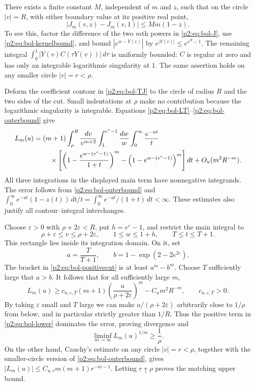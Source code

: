 \documentclass[11pt,a4paper]{article}
\theoremstyle{definition}
\theoremstyle{remark}
\numberwithin{equation}{section}
\begin{document}
There exists a finite constant $M$, independent of $m$ and $z$, such that
on the circle $|v|=R$, with either boundary value at its positive real
point,
\begin{equation}\label{p2:eq:bol-outerbound}
 |J_m(v,z)-J_m(v,1)|\le M m(1-z).
\end{equation}
To see this, factor the difference of the two $m$th powers in
\eqref{p2:eq:bol-J}, use \eqref{p2:eq:bol-kernelbound}, and bound
$|e^{w-Y(v)}|$ by $e^{|Y(v)|}\le e^{e^R-1}$.  The remaining integral
$\int_0^1|Y(v)C(\tau Y(v))|\,d\tau$ is uniformly bounded: $C$ is regular
at zero and has only an integrable logarithmic singularity at $1$.
The same assertion holds on any smaller circle $|v|=r<\rho$.

Deform the coefficient contour in \eqref{p2:eq:bol-TJ} to the circle of
radius $R$ and the two sides of the cut.  Small indentations at $\rho$
make no contribution because the logarithmic singularity is integrable.
Equations \eqref{p2:eq:bol-LT}--\eqref{p2:eq:bol-outerbound} give
\begin{align}\label{p2:eq:bol-positivecut}
 L_m(u)={}&(m+1)\int_\rho^R\frac{dv}{v^{m+2}}
 \int_1^{e^v-1}\frac{dw}{w}\int_0^\infty\frac{e^{-ut}}t\\
 &\quad\times\left[
  \left(1-\frac{e^{w-(e^v-1)}}{1+t}\right)^m
  -\left(1-e^{w-(e^v-1)}\right)^m\right]dt
 +O_u(m^2R^{-m}).\notag
\end{align}
All three integrations in the displayed main term have nonnegative
integrands.  The error follows from \eqref{p2:eq:bol-outerbound} and
$\int_0^\infty e^{-ut}(1-z(t))\,dt/t
 =\int_0^\infty e^{-ut}/(1+t)\,dt<\infty$.
These estimates also justify all contour--integral interchanges.

Choose $\varepsilon>0$ with $\rho+2\varepsilon<R$, put
$h=e^\varepsilon-1$, and restrict the main integral to
\[
 \rho+\varepsilon\le v\le\rho+2\varepsilon,
 \qquad 1\le w\le1+h,
 \qquad T\le t\le T+1.
\]
This rectangle lies inside its integration domain.  On it, set
\[
 a=\frac{T}{T+1},\qquad
 b=1-\exp(2-2e^{2\varepsilon}).
\]
The bracket in \eqref{p2:eq:bol-positivecut} is at least $a^m-b^m$.
Choose $T$ sufficiently large that $a>b$.  It follows that for all
sufficiently large $m$,
\begin{equation}\label{p2:eq:bol-lower}
 L_m(u)\ge c_{u,\varepsilon,T}(m+1)
       \left(\frac{a}{\rho+2\varepsilon}\right)^m
       -C_u m^2R^{-m},
 \qquad c_{u,\varepsilon,T}>0.
\end{equation}
By taking $\varepsilon$ small and $T$ large we can make
$a/(\rho+2\varepsilon)$ arbitrarily close to $1/\rho$ from below,
and in particular strictly greater than $1/R$.  Thus the positive term
in \eqref{p2:eq:bol-lower} dominates the error, proving divergence and
\[
 \liminf_{m\to\infty}L_m(u)^{1/m}\ge\frac1\rho.
\]
On the other hand, Cauchy's estimate on any circle $|v|=r<\rho$, together
with the smaller-circle version of \eqref{p2:eq:bol-outerbound}, gives
$|L_m(u)|\le C_{u,r}m(m+1)r^{-m-1}$.  Letting $r\uparrow\rho$ proves the
matching upper bound.
\end{document}
